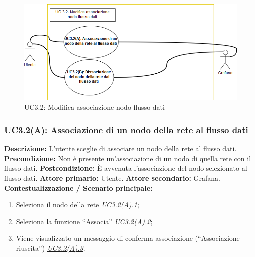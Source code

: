                      \begin{figure}[!htbp]
                    	\centering
                    	\includegraphics[scale=0.7]{UC3-2.png}
                    	\caption{UC3.2: Modifica associazione nodo-flusso dati}
                    	\label{uc3.2}
                    \end{figure}
                
                \clearpage
                    
                \subsubsection{UC3.2(A): Associazione di un nodo della rete al flusso dati}
                    \textbf{Descrizione:} L’utente sceglie di associare un nodo della rete al flusso dati.
                    \newline
                    \textbf{Precondizione:} Non è presente un'associazione di un nodo di quella rete con il flusso dati.
                    \newline
                    \textbf{Postcondizione:} \`E avvenuta l'associazione del nodo selezionato al flusso dati.
                    \newline
                    \textbf{Attore primario:} Utente.
                    \newline
                    \textbf{Attore secondario:} Grafana.
                    \newline
                    \textbf{Contestualizzazione / Scenario principale:} \begin{enumerate}
                        \item Seleziona il nodo della rete     \underline{\textit{UC3.2(A).1}};
                        \item Seleziona la funzione “Associa” \underline{\textit{UC3.2(A).2}};
                        \item Viene visualizzato un messaggio di conferma associazione (“Associazione riuscita”) \underline{\textit{UC3.2(A).3}}.
                \end{enumerate}
                    
